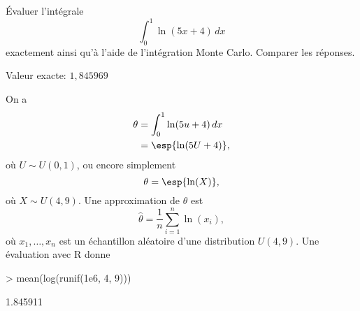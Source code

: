 \begin{exercice}
  Évaluer l'intégrale
  \begin{displaymath}
    \int_0^1 \ln(5x + 4)\, dx
  \end{displaymath}
  exactement ainsi qu'à l'aide de l'intégration Monte Carlo. Comparer
  les réponses.
  \begin{rep}
    Valeur exacte: $1,845969$
  \end{rep}
  \begin{sol}
    On a
    \begin{align*}
      \theta
      &= \int_0^1 \ln(5u + 4)\, dx \\
      &= \esp{\ln(5U + 4)},
    \end{align*}
    où $U \sim U(0, 1)$, ou encore simplement
    \begin{displaymath}
      \theta = \esp{\ln(X)},
    \end{displaymath}
    où $X \sim U(4, 9)$. Une approximation de $\theta$ est
    \begin{displaymath}
      \hat{\theta} = \frac{1}{n} \sum_{i = 1}^n \ln(x_i),
    \end{displaymath}
    où $x_1, \dots, x_n$ est un échantillon aléatoire d'une
    distribution $U(4, 9)$. Une évaluation avec \textsf{R} donne
\begin{Schunk}
\begin{Sinput}
> mean(log(runif(1e6, 4, 9)))
\end{Sinput}
\begin{Soutput}
[1] 1.845911
\end{Soutput}
\end{Schunk}
  \end{sol}
\end{exercice}

